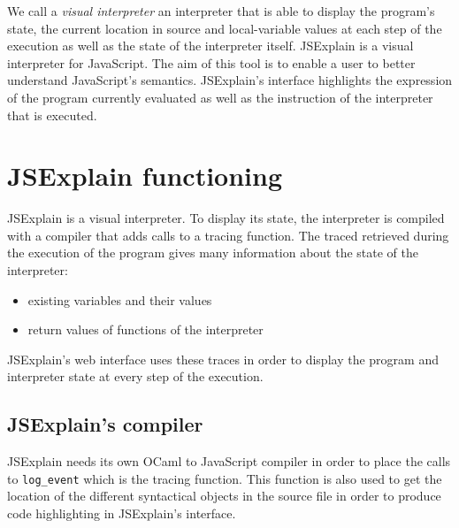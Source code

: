 \documentclass[twocolumn]{article}
\begin{document}
We call a \emph{visual interpreter} an interpreter that is able to display the program's state,
the current location in source and local-variable values at each step of the execution as well as
the state of the interpreter itself. JSExplain is a visual interpreter for JavaScript. The aim of
this tool is to enable a user to better understand JavaScript's semantics. JSExplain's interface
highlights the expression of the program currently evaluated as well as the instruction of
the interpreter that is executed.

\section{JSExplain functioning}

JSExplain is a visual interpreter. To display its state, the interpreter is compiled with a
compiler that adds calls to a tracing function. The traced retrieved during the execution of the
program gives many information about the state of the interpreter:

\begin{itemize}
	\item existing variables and their values
	\item return values of functions of the interpreter
\end{itemize}

JSExplain's web interface uses these traces in order to display the program and interpreter state
at every step of the execution.

\subsection{JSExplain's compiler}


JSExplain needs its own OCaml to JavaScript compiler in order to place the calls to
\verb|log_event| which is the tracing function. This function is also used to get the location
of the different syntactical objects in the source file in order to produce code highlighting in
JSExplain's interface.



\end{document}
